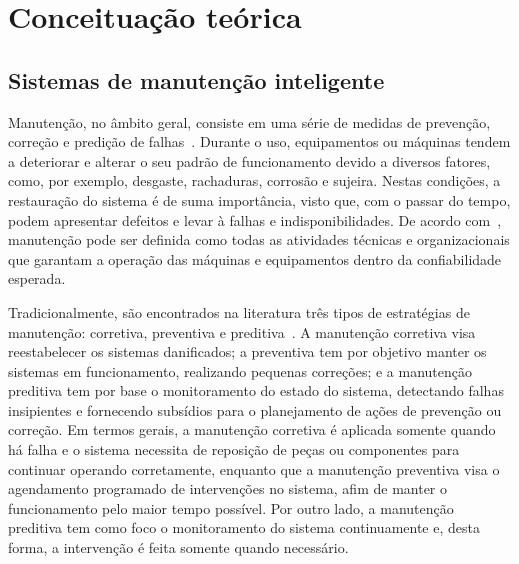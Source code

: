 \chapter{Conceituação teórica}



\section{Sistemas de manutenção inteligente}
\label{sec:manutencao-inteligente}

Manutenção, no âmbito geral, consiste em uma série de medidas de prevenção, correção e predição de
falhas~\cite{lee2006intelligent}. Durante o uso, equipamentos ou máquinas tendem a deteriorar e
alterar o seu padrão de funcionamento devido a diversos fatores, como, por exemplo, desgaste,
rachaduras, corrosão e sujeira. Nestas condições, a restauração do sistema é de suma importância,
visto que, com o passar do tempo, podem apresentar defeitos e levar à falhas e indisponibilidades.
De acordo com~\cite{marcal2005detectando}, manutenção pode ser definida como todas as atividades
técnicas e organizacionais que garantam a operação das máquinas e equipamentos dentro da
confiabilidade esperada.

Tradicionalmente, são encontrados na literatura três tipos de estratégias de
manutenção: corretiva, preventiva e preditiva~\cite{goncalves2011desenvolvimento}. A manutenção
corretiva visa reestabelecer os sistemas danificados; a preventiva tem por objetivo manter os
sistemas em funcionamento, realizando pequenas correções; e a manutenção preditiva tem por base o
monitoramento do estado do sistema, detectando falhas insipientes e fornecendo subsídios para o
planejamento de ações de prevenção ou correção. Em termos gerais, a manutenção corretiva é aplicada
somente quando há falha e o sistema necessita de reposição de peças ou componentes para continuar
operando corretamente, enquanto que a manutenção preventiva visa o agendamento programado de
intervenções no sistema, afim de manter o funcionamento pelo maior tempo possível. Por outro lado, a
manutenção preditiva tem como foco o monitoramento do sistema continuamente e, desta forma, a
intervenção é feita somente quando necessário.

